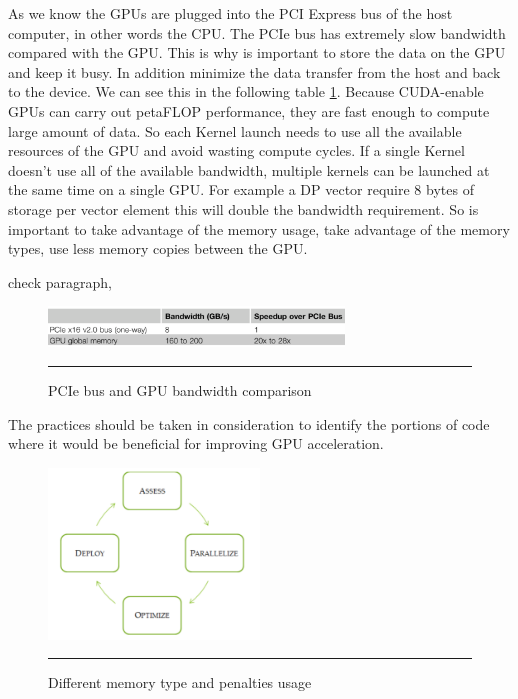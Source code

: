 As we know the GPUs are plugged into the PCI Express bus of the host computer, in other words the CPU. The PCIe bus has extremely slow bandwidth compared with the GPU. This is why is important to store the data on the GPU and keep it busy. In addition minimize the data transfer from the host and back to the device. We can see this in the following table \ref{fig:PCI}.  Because CUDA-enable GPUs can carry out petaFLOP performance, they are fast enough to compute large amount of data. So each Kernel launch needs to use all the available resources of the GPU and avoid wasting compute cycles. If a single Kernel doesn't use all of the available bandwidth, multiple kernels can be launched at the same time on a single GPU.
For example a DP vector require 8 bytes of storage per vector element this will double the bandwidth requirement. So is important to take advantage of the memory usage, take advantage of the memory types, use less memory copies between the GPU. \cite{design} 

check paragraph,

\begin{figure}[htbp]
	\centering
		\includegraphics[width=0.7\textwidth]{Figures/PCI.png}
		\rule{35em}{0.5pt}
	\caption[PCIe Bandwidth]{PCIe bus and GPU bandwidth comparison }
	\label{fig:PCI}
\end{figure}

The practices should be taken in consideration to identify the portions of code where it would be beneficial for improving GPU acceleration.\cite{practices}

\begin{figure}[htbp]
	\centering
		\includegraphics[width=0.5\textwidth]{Figures/apod.png}
		\rule{35em}{0.5pt}
	\caption[Different memory types]{Different memory type and penalties usage}
	\label{fig:apod}
\end{figure}

